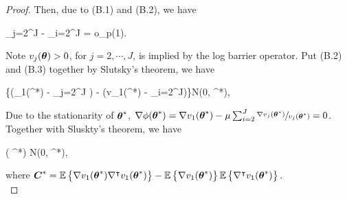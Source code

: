 \begin{proof}
	Then, due to (B.1) and (B.2), we have
	\begin{flalign}
	\sum_{j=2}^J  -  \sum_{i=2}^{J} = o_p(1).
	\end{flalign}
	Note $v_j(\boldsymbol{\theta}) > 0$, for $j =2, \cdots, J$, is implied by the log barrier operator. Put (B.2) and (B.3) together by Slutsky's theorem, we have
	\begin{flalign*}
	\lt\{\lt(\nabla{}_1(\bs{\theta}^*) - \mu \sum_{j=2}^J \rt) - \lt(\nabla v_1(\bs{\theta}^*) - \mu \sum_{i=2}^{J}\rt)\rt\}N\lt(0, ^*\rt),
	\end{flalign*} 
	Due to the stationarity of $\boldsymbol{\theta}^*$, $\nabla \phi(\boldsymbol{\theta}^*)=\nabla v_1(\boldsymbol{\theta}^*) - \mu \sum_{i=2}^{J}\sfrac{\nabla v_j(\boldsymbol{\theta}^*)}{v_j(\boldsymbol{\theta}^*)} =0$. Together with Sluskty's theorem, we have 
	\begin{flalign*}
	 \nabla\wh{\phi}( \bs{\theta}^*)  N\lt(0, ^*\rt),
	\end{flalign*}
	where 
	$\boldsymbol{C}^* =\mathbb{E}\left\{  \nabla v_1(\boldsymbol{\theta}^*)\nabla^{\intercal} v_1(\boldsymbol{\theta}^*) \right\} - \mathbb{E}\left\{\nabla v_1(\boldsymbol{\theta}^*)\right\} \mathbb{E}\left\{\nabla^{\intercal} v_1(\boldsymbol{\theta}^*)\right\}.$ \\
	

\end{proof}
